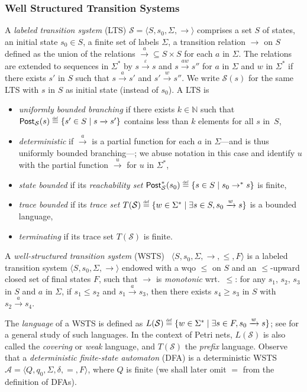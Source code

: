 \documentclass[11pt,reqno,a4paper]{amsart}
\newcommand{\eqdef}{\stackrel{\raisebox{-.15ex}{\scalebox{.5}{\upshape\textrm{def}}}}{=}}
\newcommand{\tup}[1]{\langle #1\rangle}
\newcommand{\ra}{\mathrel{\rightarrow^\ast}}
\newcommand{\ru}[1]{\xrightarrow{#1}}
\theoremstyle{plain}
\theoremstyle{definition}
\theoremstyle{remark}
\renewcommand{\paragraph}{\subsubsection*}
\begin{document}
\paragraph{Well Structured Transition Systems}
A \emph{labeled transition system} (LTS)
$\mathcal{S}=\tup{S,s_0,\Sigma,\rightarrow}$ comprises a set $S$ of
states, an initial state $s_0\in S$, a finite set of labels $\Sigma$, a
transition relation $\rightarrow$ on $S$ defined as the union of the
relations ${\ru{a}}\subseteq S\times S$ for each $a$ in $\Sigma$.  The
relations are extended to sequences in $\Sigma^\ast$ by
$s\ru{\varepsilon}s$ and $s\ru{aw}s''$ for $a$ in $\Sigma$ and $w$ in
$\Sigma^\ast$ if there exists $s'$ in $S$ such
that $s\ru{a}s'$ and $s'\ru{w}s''$.  We write $\mathcal{S}(s)$ for the
same LTS with $s$ in $S$ as initial state (instead of $s_0$).  A LTS is
\begin{itemize}
\item \emph{uniformly bounded branching} if there exists $k \in \mathbb{N}$ such that
  $\mathsf{Post}_{\mathcal{S}}(s)\eqdef\{s'\in S\mid s\ru{}s'\}$ contains less than $k$ elements
  for all $s$ in~$S$,
\item \emph{deterministic} if $\ru{a}$ is a partial function for each
  $a$ in $\Sigma$---and is thus uniformly bounded branching---; we abuse
  notation in this case and identify $u$ with the partial function
  $\ru{u}$ for $u$ in $\Sigma^\ast$,
\item \emph{state bounded} if its \emph{reachability set}
  $\mathsf{Post}_{\mathcal{S}}^\ast(s_0)\eqdef\{s\in S\mid s_0\ra s\}$ is finite,
\item \emph{trace bounded} if its \emph{trace set}
  $T(\mathcal{S})\eqdef\{w\in\Sigma^\ast\mid\exists
    s\in S,s_0\ru{w}s\}$ is a bounded language,
\item \emph{terminating} if its trace set $T(\mathcal{S})$ is finite.
\end{itemize}

A \emph{well-structured transition system} (WSTS)~\citep{origwsts,wqo,wsts}
$\tup{S,s_0,\Sigma,{\rightarrow},{\leq},F}$ is a labeled
transition system $\tup{S,s_0,\Sigma,{\rightarrow}}$ 
endowed with a wqo
$\leq$ on $S$ and an $\leq$-upward closed set of final states $F$, such
that $\rightarrow$ is \emph{monotonic} wrt.\ $\leq$: for any $s_1$,
$s_2$, $s_3$ in $S$ and $a$ in $\Sigma$, if $s_1\leq s_2$ and
$s_1\ru{a}s_3$, then there exists $s_4\geq s_3$ in $S$ with
$s_2\ru{a}s_4$.

The \emph{language} of a WSTS is defined as
$L(\mathcal{S})\eqdef\{w\in\Sigma^\ast\mid\exists s\in F,s_0\ru{w}s\}$; see
\citet{wsl} for a general study of such languages.  In the context of
Petri nets, $L(\mathcal{S})$ is also called the \emph{covering} or \emph{weak}
language, and $T(\mathcal{S})$ the \emph{prefix} language.  Observe that a
\emph{deterministic finite-state automaton} (DFA) is a deterministic
WSTS $\mathcal{A}=\tup{Q,q_0,\Sigma,\delta,{=},F}$, where $Q$ is
finite (we shall later omit $=$ from the definition of DFAs).
\end{document}
